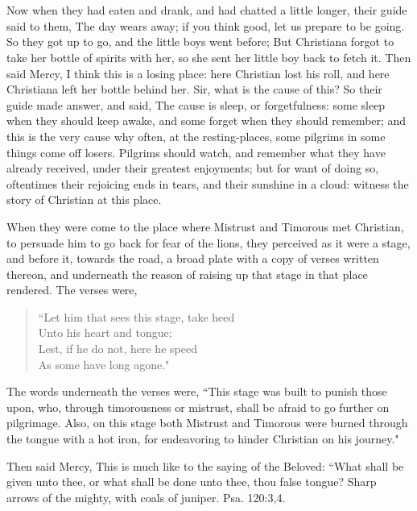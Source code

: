 \chapter[THE FOURTH STAGE]{}

Now when they had eaten and drank, and had chatted a little longer, their guide said to them, The day wears away; if you think good, let us prepare to be going. So they got up to go, and the little boys went before; But Christiana forgot to take her bottle of spirits with her, so she sent her little boy back to fetch it. Then said Mercy, I think this is a losing place: here Christian lost his roll, and here Christiana left her bottle behind her. Sir, what is the cause of this? So their guide made answer, and said, The cause is sleep, or forgetfulness: some sleep when they should keep awake, and some forget when they should remember; and this is the very cause why often, at the resting-places, some pilgrims in some things come off losers. Pilgrims should watch, and remember what they have already received, under their greatest enjoyments; but for want of doing so, oftentimes their rejoicing ends in tears, and their sunshine in a cloud: witness the story of Christian at this place.

When they were come to the place where Mistrust and Timorous met Christian, to persuade him to go back for fear of the lions, they perceived as it were a stage, and before it, towards the road, a broad plate with a copy of verses written thereon, and underneath the reason of raising up that stage in that place rendered. The verses were,
\begin{verse}
``Let him that sees this stage, take heed\\
Unto his heart and tongue;\\
Lest, if he do not, here he speed\\
As some have long agone."\\
\end{verse}

The words underneath the verses were, ``This stage was built to punish those upon, who, through timorousness or mistrust, shall be afraid to go further on pilgrimage. Also, on this stage both Mistrust and Timorous were burned through the tongue with a hot iron, for endeavoring to hinder Christian on his journey."

Then said Mercy, This is much like to the saying of the Beloved: ``What shall be given unto thee, or what shall be done unto thee, thou false tongue? Sharp arrows of the mighty, with coals of juniper. Psa. 120:3,4.

